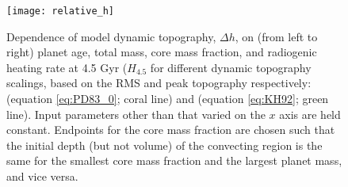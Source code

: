 \begin{figure}
  \centering
  \texttt{[image: relative\_h]}
\caption{Dependence of model dynamic topography, $\Delta h$, on (from left to right) planet age, total mass, core mass fraction, and radiogenic heating rate at 4.5 Gyr ($H_{4.5}$ for different dynamic topography scalings, based on the RMS and peak topography respectively: \citet{Parsons1983} (equation \ref{eq:PD83_0}; coral line) and \citet{Kiefer1992} (equation \ref{eq:KH92}; green line). Input parameters other than that varied on the $x$ axis are held constant. Endpoints for the core mass fraction are chosen such that the initial depth (but not volume) of the convecting region is the same for the smallest core mass fraction and the largest planet mass, and vice versa.}
\label{fig:RMS_v_planet}
\end{figure}


